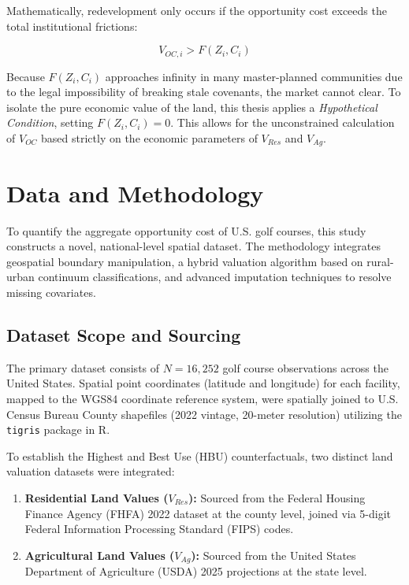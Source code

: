 \documentclass[10pt, letterpaper]{article}
\begin{document}
Mathematically, redevelopment only occurs if the opportunity cost exceeds the total institutional frictions:

\begin{equation}
    V_{OC, i} > F(Z_i, C_i)
\end{equation}

Because $F(Z_i, C_i)$ approaches infinity in many master-planned communities due to the legal impossibility of breaking stale covenants, the market cannot clear. To isolate the pure economic value of the land, this thesis applies a \textit{Hypothetical Condition}, setting $F(Z_i, C_i) = 0$. This allows for the unconstrained calculation of $V_{OC}$ based strictly on the economic parameters of $V_{Res}$ and $V_{Ag}$.

\newpage

\section{Data and Methodology}

To quantify the aggregate opportunity cost of U.S. golf courses, this study constructs a novel, national-level spatial dataset. The methodology integrates geospatial boundary manipulation, a hybrid valuation algorithm based on rural-urban continuum classifications, and advanced imputation techniques to resolve missing covariates.

\subsection{Dataset Scope and Sourcing}
The primary dataset consists of $N = 16,252$ golf course observations across the United States. Spatial point coordinates (latitude and longitude) for each facility, mapped to the WGS84 coordinate reference system, were spatially joined to U.S. Census Bureau County shapefiles (2022 vintage, 20-meter resolution) utilizing the \texttt{tigris} package in R. 

To establish the Highest and Best Use (HBU) counterfactuals, two distinct land valuation datasets were integrated:
\begin{enumerate}
    \item \textbf{Residential Land Values ($V_{Res}$):} Sourced from the Federal Housing Finance Agency (FHFA) 2022 dataset at the county level, joined via 5-digit Federal Information Processing Standard (FIPS) codes.
    \item \textbf{Agricultural Land Values ($V_{Ag}$):} Sourced from the United States Department of Agriculture (USDA) 2025 projections at the state level.
\end{enumerate}
\end{document}
